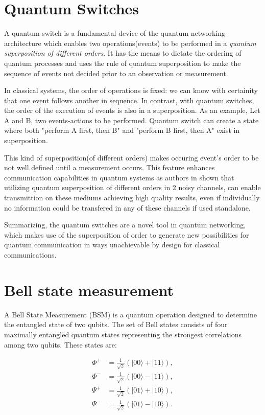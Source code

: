 		\section{Quantum Switches}
		
		A quantum switch is a fundamental device of the quantum networking 
		architecture which
		enables two operations(events) to be performed in a \textit{quantum superposition of different orders}. 
		It has the means to dictate the ordering of quantum processes and
		uses the rule of quantum superposition to make the sequence of events not decided 
		prior to an observation or measurement.

		In classical systems, the order of operations is fixed: we can know with certainity that one event follows another in sequence. 
		In contrast, with quantum switches, the order of the execution of events is also in a superposition.
		As an example,
		Let A and B, two events-actions to be performed. Quantum switch can create a state where both "perform A first, then B"
		and "perform B first, then A" exist in superposition.

		This kind of superposition(of different orders) makes occuring event's order to be not well defined until
		a measurement occurs. This feature enhances communication capabilities in quantum systems as authors in \cite{superposition-orders-proof}
		shown that utilizing quantum superposition of different orders in 2 noisy channels, 
		can enable transmittion on these mediums achieving high quality results,
		even if individually no information could be transfered in any of these channels if used standalone. 

		Summarizing, the quantum switches are a novel tool in quantum networking, 
		which makes use of the superposition of order to generate new possibilities for 
		quantum communication in ways unachievable by design for classical communications. 

		\section{Bell state measurement}

		A Bell State Measurement (BSM) is a quantum operation designed to determine
		the entangled state of two qubits. The set of Bell states consists of four 
		maximally entangled quantum states representing the strongest correlations
		among two qubits. These states are:

			\begin{align*}
			    \Phi^+ &= \frac{1}{\sqrt{2}} (|00\rangle + |11\rangle), \\
			    \Phi^- &= \frac{1}{\sqrt{2}} (|00\rangle - |11\rangle), \\
			    \Psi^+ &= \frac{1}{\sqrt{2}} (|01\rangle + |10\rangle), \\
			    \Psi^- &= \frac{1}{\sqrt{2}} (|01\rangle - |10\rangle).
			\end{align*}

